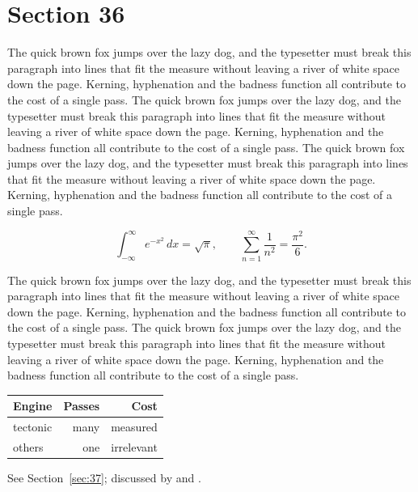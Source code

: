 \documentclass{article}
\begin{document}
\section{Section 36}
\label{sec:36}
The quick brown fox jumps over the lazy dog, and the typesetter must break this paragraph into lines that fit the measure without leaving a river of white space down the page. Kerning, hyphenation and the badness function all contribute to the cost of a single pass. The quick brown fox jumps over the lazy dog, and the typesetter must break this paragraph into lines that fit the measure without leaving a river of white space down the page. Kerning, hyphenation and the badness function all contribute to the cost of a single pass. The quick brown fox jumps over the lazy dog, and the typesetter must break this paragraph into lines that fit the measure without leaving a river of white space down the page. Kerning, hyphenation and the badness function all contribute to the cost of a single pass. 

\begin{equation}\label{eq:36}
\int_{-\infty}^{\infty} e^{-x^{2}}\,dx = \sqrt{\pi}, \qquad
\sum_{n=1}^{\infty} \frac{1}{n^{2}} = \frac{\pi^{2}}{6}.
\end{equation}

The quick brown fox jumps over the lazy dog, and the typesetter must break this paragraph into lines that fit the measure without leaving a river of white space down the page. Kerning, hyphenation and the badness function all contribute to the cost of a single pass. The quick brown fox jumps over the lazy dog, and the typesetter must break this paragraph into lines that fit the measure without leaving a river of white space down the page. Kerning, hyphenation and the badness function all contribute to the cost of a single pass. 

\begin{center}
\begin{tabular}{lrr}
\toprule
Engine & Passes & Cost \\
\midrule
tectonic & many & measured \\
others & one & irrelevant \\
\bottomrule
\end{tabular}
\end{center}

See Section~\ref{sec:37}; discussed by \textcite{k2} and \textcite{l4}.
\end{document}
